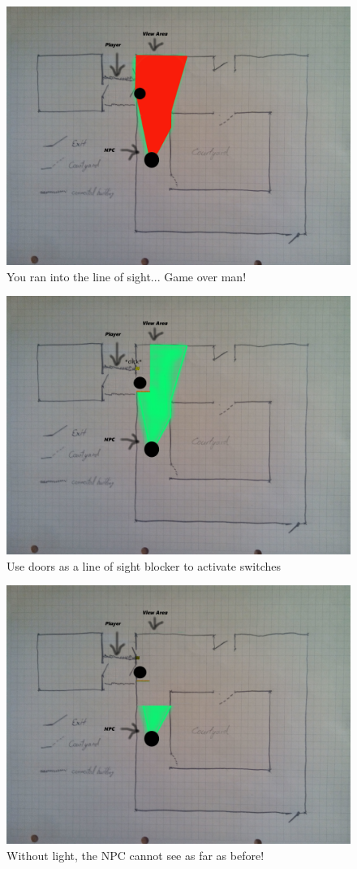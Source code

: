 \documentclass[12pt]{article}
\begin{document}
\begin{figure}[ht]
	\centering
	\includegraphics[width=1\linewidth]{Images/gotcaught}
	\caption{You ran into the line of sight... Game over man!}
\end{figure}

\begin{figure}[ht]
	\centering
	\includegraphics[width=1\linewidth]{Images/notgotcaught}
	\caption{Use doors as a line of sight blocker to activate switches}
\end{figure}

\begin{figure}[ht]
	\centering
	\includegraphics[width=1\linewidth]{Images/lightsofflineofsight}
	\caption{Without light, the NPC cannot see as far as before!}
\end{figure}        
\end{document}
